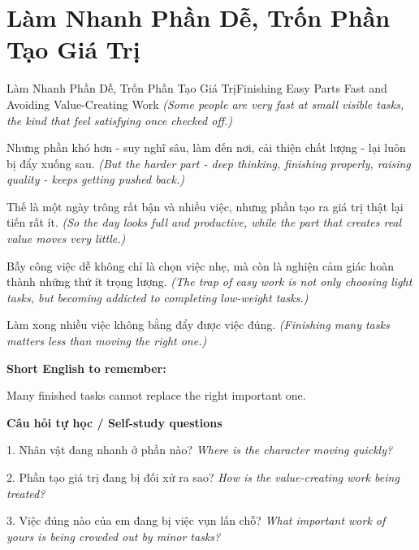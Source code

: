 \section{Làm Nhanh Phần Dễ, Trốn Phần Tạo Giá Trị}
\begin{truyen}{Làm Nhanh Phần Dễ, Trốn Phần Tạo Giá Trị}{Finishing Easy Parts Fast and Avoiding Value-Creating Work}
\textit{(Some people are very fast at small visible tasks, the kind that feel satisfying once checked off.)}

Nhưng phần khó hơn - suy nghĩ sâu, làm đến nơi, cải thiện chất lượng - lại luôn bị đẩy xuống sau.
\textit{(But the harder part - deep thinking, finishing properly, raising quality - keeps getting pushed back.)}

Thế là một ngày trông rất bận và nhiều việc, nhưng phần tạo ra giá trị thật lại tiến rất ít.
\textit{(So the day looks full and productive, while the part that creates real value moves very little.)}

Bẫy công việc dễ không chỉ là chọn việc nhẹ, mà còn là nghiện cảm giác hoàn thành những thứ ít trọng lượng.
\textit{(The trap of easy work is not only choosing light tasks, but becoming addicted to completing low-weight tasks.)}

\end{truyen}

\begin{baihoc}
Làm xong nhiều việc không bằng đẩy được việc đúng.
\textit{(Finishing many tasks matters less than moving the right one.)}
\end{baihoc}

\begin{ghinhoanh}
\textbf{Short English to remember:}

Many finished tasks cannot replace the right important one.

\end{ghinhoanh}

\begin{tuhocnhanh}
\textbf{Câu hỏi tự học / Self-study questions}

1. Nhân vật đang nhanh ở phần nào? \textit{Where is the character moving quickly?}

2. Phần tạo giá trị đang bị đối xử ra sao? \textit{How is the value-creating work being treated?}

3. Việc đúng nào của em đang bị việc vụn lấn chỗ? \textit{What important work of yours is being crowded out by minor tasks?}
\end{tuhocnhanh}
\ngancach

